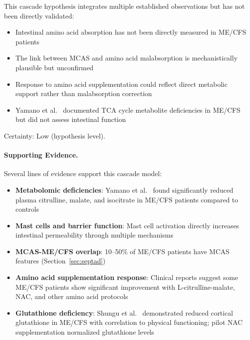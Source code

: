 \begin{warning}
This cascade hypothesis integrates multiple established observations but has not been directly validated:
\begin{itemize}
    \item Intestinal amino acid absorption has not been directly measured in ME/CFS patients
    \item The link between MCAS and amino acid malabsorption is mechanistically plausible but unconfirmed
    \item Response to amino acid supplementation could reflect direct metabolic support rather than malabsorption correction
    \item Yamano et al.~\cite{Yamano2016tca_urea} documented TCA cycle metabolite deficiencies in ME/CFS but did not assess intestinal function
\end{itemize}
Certainty: Low (hypothesis level).
\end{warning}

\paragraph{Supporting Evidence.}

Several lines of evidence support this cascade model:

\begin{itemize}
    \item \textbf{Metabolomic deficiencies}: Yamano et al.~\cite{Yamano2016tca_urea} found significantly reduced plasma citrulline, malate, and isocitrate in ME/CFS patients compared to controls
    \item \textbf{Mast cells and barrier function}: Mast cell activation directly increases intestinal permeability through multiple mechanisms~\cite{GutPermeability2023}
    \item \textbf{MCAS-ME/CFS overlap}: 10--50\% of ME/CFS patients have MCAS features (Section~\ref{sec:septad})
    \item \textbf{Amino acid supplementation response}: Clinical reports suggest some ME/CFS patients show significant improvement with L-citrulline-malate, NAC, and other amino acid protocols
    \item \textbf{Glutathione deficiency}: Shungu et al.~\cite{Shungu2012glutathione} demonstrated reduced cortical glutathione in ME/CFS with correlation to physical functioning; pilot NAC supplementation normalized glutathione levels
\end{itemize}

